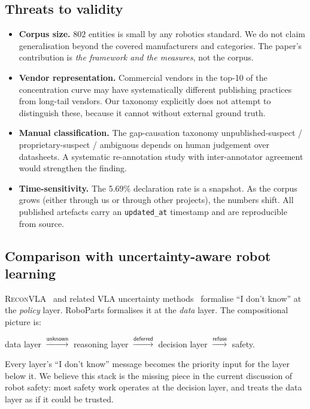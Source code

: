 \subsection{Threats to validity}

\begin{itemize}[nosep,leftmargin=*]
\item \textbf{Corpus size.} $802$ entities is small by any robotics
standard. We do not claim generalisation beyond the covered
manufacturers and categories. The paper's contribution is
\emph{the framework and the measures}, not the corpus.

\item \textbf{Vendor representation.} Commercial vendors in the top-10
of the concentration curve may have systematically different
publishing practices from long-tail vendors. Our taxonomy explicitly
does not attempt to distinguish these, because it cannot without
external ground truth.

\item \textbf{Manual classification.} The gap-causation taxonomy
unpublished-suspect / proprietary-suspect / ambiguous depends on
human judgement over datasheets. A systematic re-annotation study
with inter-annotator agreement would strengthen the finding.

\item \textbf{Time-sensitivity.} The 5.69\% declaration rate is a
snapshot. As the corpus grows (either through us or through other
projects), the numbers shift. All published artefacts carry an
\texttt{updated\_at} timestamp and are reproducible from source.
\end{itemize}

\subsection{Comparison with uncertainty-aware robot learning}

\textsc{ReconVLA}~\cite{R10} and related VLA uncertainty
methods~\cite{R11} formalise ``I don't know'' at the \emph{policy}
layer. RoboParts formalises it at the \emph{data} layer. The
compositional picture is:

\begin{center}
data layer $\xrightarrow{\mathsf{unknown}}$
reasoning layer $\xrightarrow{\mathsf{deferred}}$
decision layer $\xrightarrow{\mathsf{refuse}}$
safety.
\end{center}

Every layer's ``I don't know'' message becomes the priority input
for the layer below it. We believe this stack is the missing piece
in the current discussion of robot safety: most safety work
operates at the decision layer, and treats the data layer as if
it could be trusted.

